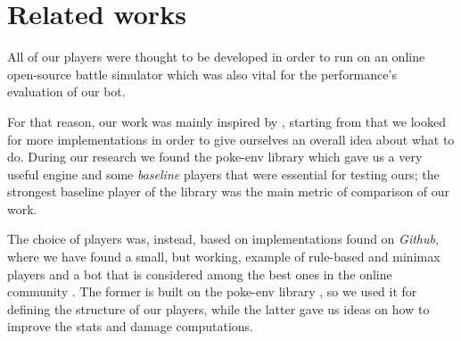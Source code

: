 \section{Related works}\label{sec:relatedworks}
All of our players were thought to be developed in order to run on an online open-source \poke battle simulator \cite{remote_server} which was also vital for the performance's evaluation of our bot.

For that reason, our work was mainly inspired by \cite{showdown_competition}, starting from that we looked for more implementations in order to give ourselves an overall idea about what to do. During our research we found the poke-env library \cite{poke_env} which gave us a very useful engine and some \textit{baseline} players that were essential for testing ours; the strongest baseline player of the library was the main metric of comparison of our work.

The choice of players was, instead, based on implementations found on \textit{Github}, where we have found a small, but working, example of rule-based and minimax players \cite{rempton} and a bot that is considered among the best ones in the online community \cite{pmariglia}. The former is built on the poke-env library \cite{poke_env}, so we used it for defining the structure of our players, while the latter gave us ideas on how to improve the stats and damage computations.
